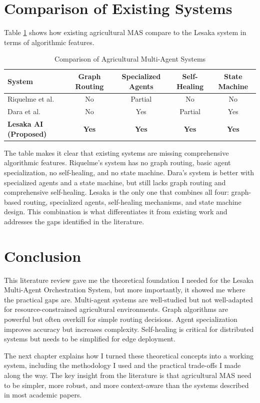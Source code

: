 \section{Comparison of Existing Systems}

Table \ref{tab:comparison} shows how existing agricultural MAS compare to the Lesaka system in terms of algorithmic features.

\begin{table}[H]
\centering
\caption{Comparison of Agricultural Multi-Agent Systems}
\label{tab:comparison}
\begin{tabular}{|l|c|c|c|c|}
\hline
\textbf{System} & \textbf{Graph Routing} & \textbf{Specialized Agents} & \textbf{Self-Healing} & \textbf{State Machine} \\
\hline
Riquelme et al. \cite{riquelme2018smonitor} & No & Partial & No & No \\
Dara et al. \cite{dara2018precision} & No & Yes & Partial & Yes \\
\textbf{Lesaka AI (Proposed)} & \textbf{Yes} & \textbf{Yes} & \textbf{Yes} & \textbf{Yes} \\
\hline
\end{tabular}
\end{table}

The table makes it clear that existing systems are missing comprehensive algorithmic features. Riquelme's system has no graph routing, basic agent specialization, no self-healing, and no state machine. Dara's system is better with specialized agents and a state machine, but still lacks graph routing and comprehensive self-healing. Lesaka is the only one that combines all four: graph-based routing, specialized agents, self-healing mechanisms, and state machine design. This combination is what differentiates it from existing work and addresses the gaps identified in the literature.

\section{Conclusion}

This literature review gave me the theoretical foundation I needed for the Lesaka Multi-Agent Orchestration System, but more importantly, it showed me where the practical gaps are. Multi-agent systems are well-studied but not well-adapted for resource-constrained agricultural environments. Graph algorithms are powerful but often overkill for simple routing decisions. Agent specialization improves accuracy but increases complexity. Self-healing is critical for distributed systems but needs to be simplified for edge deployment.

The next chapter explains how I turned these theoretical concepts into a working system, including the methodology I used and the practical trade-offs I made along the way. The key insight from the literature is that agricultural MAS need to be simpler, more robust, and more context-aware than the systems described in most academic papers.
